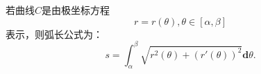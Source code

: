 \begin{corollary}[极坐标方程的弧长]
	若曲线$C$是由极坐标方程
	\begin{equation}
		r = r(\theta),\theta\in[\alpha,\beta]
	\end{equation}	
	表示，则弧长公式为：
	\begin{equation}
		s = \int_{\alpha}^{\beta}\sqrt{r^2(\theta)+\left(r'(\theta)\right)^2}\textbf{d}\theta.
	\end{equation}
\end{corollary}





